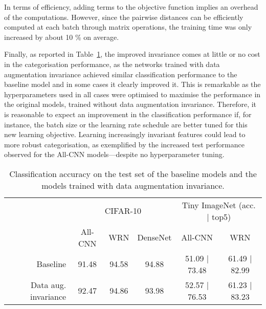 {In terms of efficiency, adding terms to the objective function implies an overhead of the computations. However, since the pairwise distances can be efficiently computed at each batch through matrix operations, the training time was only increased by about 10 \% on average. 

Finally, as reported in Table~\ref{tab:accuracy}, the improved invariance comes at little or no cost in the categorisation performance, as the networks trained with data augmentation invariance achieved similar classification performance to the baseline model and in some cases it clearly improved it. This is remarkable as the hyperparameters used in all cases were optimised to maximise the performance in the original models, trained without data augmentation invariance. Therefore, it is reasonable to expect an improvement in the classification performance if, for instance, the batch size or the learning rate schedule are better tuned for this new learning objective. Learning increasingly invariant features could lead to more robust categorisation, as exemplified by the increased test performance observed for the All-CNN models---despite no hyperparameter tuning.

\begin{table}[tb]
  \begin{center}
    \begin{tabular}{rccccc}
	  & \multicolumn{3}{c}{CIFAR-10} & \multicolumn{2}{c}{Tiny ImageNet (acc. | top5)}          \\
      \cline{2-6} 
	                               & All-CNN & WRN   & DenseNet & All-CNN       & WRN   \\
	  Baseline                     & 91.48   & 94.58 & 94.88    & 51.09 | 73.48 & 61.49 | 82.99 \\
	  Data aug. invariance         & 92.47   & 94.86 & 93.98    & 52.57 | 76.53 & 61.23 | 83.23
    \end{tabular}
  \end{center}
  \caption{Classification accuracy on the test set of the baseline models and the models trained with data augmentation invariance.}
  \label{tab:accuracy}
\end{table}

}
